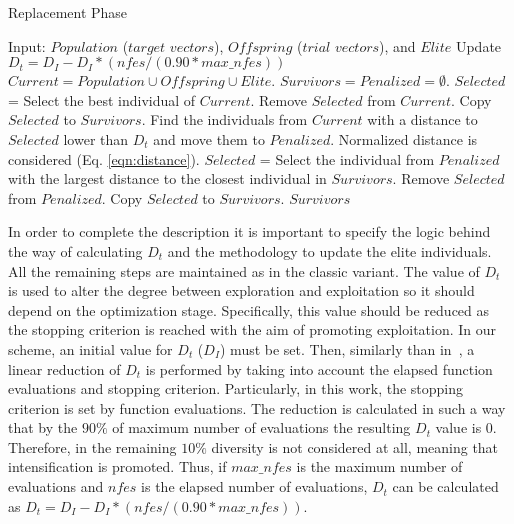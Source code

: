 \begin{algorithm}[t]
  \scriptsize
	\caption{Replacement Phase} \label{alg:Replacement}
	\begin{algorithmic}[1]
	\STATE Input: $Population$ ($target$ $vectors$), $Offspring$ ($trial$ $vectors$), and $Elite$
	\STATE Update $D_t = D_I - D_I *(nfes/(0.90*max\_nfes)) $ 
	\STATE $Current = Population \cup Offspring \cup Elite$.
	\STATE $Survivors = Penalized = \emptyset$.
	   \STATE $Selected$ = Select the best individual of $Current$.
		 \STATE Remove $Selected$ from $Current$.
	   \STATE Copy $Selected$ to $Survivors$.
	   \STATE Find the individuals from $Current$ with a distance to $Selected$ lower than $D_t$ and move them to $Penalized$. Normalized distance is considered (Eq. \ref{eqn:distance}).
	\ENDWHILE
	   \STATE $Selected$ = Select the individual from $Penalized$ with the largest distance to the closest individual in $Survivors$.
		 \STATE Remove $Selected$ from $Penalized$.
	   \STATE Copy $Selected$ to $Survivors$.
	\ENDWHILE
  \RETURN $Survivors$
\end{algorithmic}
\end{algorithm}


In order to complete the description it is important to specify the logic behind the way of calculating $D_t$ and the methodology to update the 
elite individuals.
%
All the remaining steps are maintained as in the classic \DE{} variant.
%
The value of $D_t$ is used to alter the degree between exploration and exploitation so it should depend on the optimization stage.
%
Specifically, this value should be reduced as the stopping criterion is reached with the aim of promoting exploitation.
%
In our scheme, an initial value for $D_t$ ($D_I$) must be set.
%
Then, similarly than in~\cite{segura2016novel}, a linear reduction of $D_t$ is performed by taking into account the elapsed function evaluations and stopping criterion.
%
Particularly, in this work, the stopping criterion is set by function evaluations.
%
The reduction is calculated in such a way that by the $90\%$ of maximum number of evaluations the resulting $D_t$ value is $0$.
%
Therefore, in the remaining $10\%$ diversity is not considered at all, meaning that intensification is promoted.
%
Thus, if $max\_nfes$ is the maximum number of evaluations and $nfes$ is the elapsed number of evaluations, $D_t$ can be calculated as $D_t=D_I - D_I *(nfes/(0.90*max\_nfes))$.
%
%

